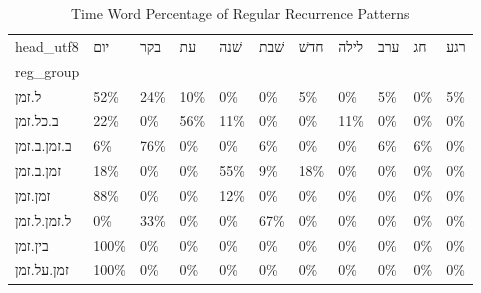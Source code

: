 \begin{table}[htbp!]
\centering
\caption{Time Word Percentage of Regular Recurrence Patterns}
\label{table:regrechead_pc}
\begin{tabular}{lllllllllll}
\toprule
head\_utf8 &   יום &  בקר &   עת & שׁנה & שׁבת & חדשׁ & לילה & ערב &  חג & רגע \\
reg\_group   &       &      &      &      &      &      &      &     &     &     \\
\midrule
ל.זמן       &   52\% &  24\% &  10\% &   0\% &   0\% &   5\% &   0\% &  5\% &  0\% &  5\% \\
ב.כל.זמן    &   22\% &   0\% &  56\% &  11\% &   0\% &   0\% &  11\% &  0\% &  0\% &  0\% \\
ב.זמן.ב.זמן &    6\% &  76\% &   0\% &   0\% &   6\% &   0\% &   0\% &  6\% &  6\% &  0\% \\
זמן.ב.זמן   &   18\% &   0\% &   0\% &  55\% &   9\% &  18\% &   0\% &  0\% &  0\% &  0\% \\
זמן.זמן     &   88\% &   0\% &   0\% &  12\% &   0\% &   0\% &   0\% &  0\% &  0\% &  0\% \\
ל.זמן.ל.זמן &    0\% &  33\% &   0\% &   0\% &  67\% &   0\% &   0\% &  0\% &  0\% &  0\% \\
בין.זמן     &  100\% &   0\% &   0\% &   0\% &   0\% &   0\% &   0\% &  0\% &  0\% &  0\% \\
זמן.על.זמן  &  100\% &   0\% &   0\% &   0\% &   0\% &   0\% &   0\% &  0\% &  0\% &  0\% \\
\bottomrule
\end{tabular}
\end{table}
